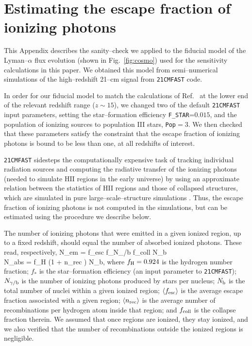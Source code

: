 \section{Estimating the escape fraction of ionizing photons}

This Appendix describes the sanity--check we applied to the fiducial model of the Lyman--$\alpha$ flux evolution (shown in Fig.~\ref{fig:cosmo}) used for the sensitivity calculations in this paper. We obtained this model from semi--numerical simulations of the high--redshift 21--cm signal from \texttt{21CMFAST} code.  

In order for our fiducial model to match the calculations of Ref.~\cite{2012ApJ...746..125H} at the lower end of the relevant redshift range ($z\sim 15$), we changed two of the default \texttt{21CMFAST} input parameters, setting the star--formation efficiency  \verb|F_STAR|=$0.015$, and the population of ionizing sources to population III stars, \texttt{Pop}$=3$. We then checked that these parameters satisfy the constraint that the escape fraction of ionizing photons is bound to be less than one, at all redshifts of interest. 

\texttt{21CMFAST} sidesteps the computationally expensive task of tracking individual radiation sources and computing the radiative transfer of the ionizing photons (needed to simulate HII regions in the early universe) by using an approximate relation between the statistics of HII regions and those of collapsed structures, which are simulated in pure large--scale--structure simulations \cite{2004ApJ...613....1F}. Thus, the escape fraction of ionizing photons is not computed in the simulations, but can be estimated using the procedure we describe below. 

The number of ionizing photons that were emitted in a given ionized region, up to a fixed redshift, should equal the number of absorbed ionized photons. These read, respectively, 
\beq    
\bga
N_{\rm em} = \langle f_{\rm esc} \rangle f_\ast N_{\gamma/{\rm b}} f_{\rm coll} N_{\rm b}\\
N_{\rm abs} = f_{\rm H} (1 + \langle n_{\rm rec} \rangle) N_{\rm b},
\ega
\label{eq:pbalance}
\eeq 
where $f_{\rm H} = 0.924$ is the hydrogen number fraction; $f_\ast$ is the star--formation efficiency (an input parameter to \texttt{21CMFAST}); $N_{\gamma/{\rm b}}$ is the number of ionizing photons produced by stars per nucleus; $N_{\rm b}$ is the total number of nuclei within a given ionized region; $\langle f_{\rm esc} \rangle$ is the average escape fraction associated with a given region; $\langle n_{\rm rec} \rangle$ is the average number of recombinations per hydrogen atom inside that region; and $f_{\rm coll}$ is the collapse fraction therein. We assumed that once regions are ionized, they stay ionized, and we also verified that the number of recombinations outside the ionized regions is negligible. 


